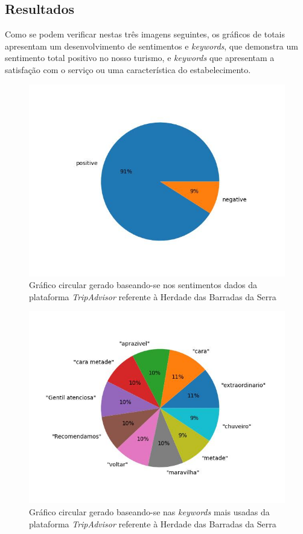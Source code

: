 \subsection{Resultados}

Como se podem verificar nestas três imagens seguintes, os gráficos de totais apresentam um desenvolvimento de sentimentos e \textit{keywords}, que demonstra um sentimento total positivo no nosso turismo, e \textit{keywords} que apresentam a satisfação com o serviço ou uma característica do estabelecimento.

\begin{figure}[!htb]
\centering
\includegraphics[width=14cm]{figuras/TripAdvisor/Hotels/hotel21_sentiments.jpeg}
\caption{Gráfico circular gerado baseando-se nos sentimentos dados da plataforma \textit{TripAdvisor} referente à Herdade das Barradas da Serra}
\label{fig:exemplofig21sentimentsTrip}
\end{figure}

\begin{figure}[!htb]
\centering
\includegraphics[width=14cm]{figuras/TripAdvisor/Hotels/hotel21_keywords.jpeg}
\caption{Gráfico circular gerado baseando-se nas \textit{keywords} mais usadas da plataforma \textit{TripAdvisor} referente à Herdade das Barradas da Serra}
\label{fig:exemplofig21keywordsTrip}
\end{figure}

